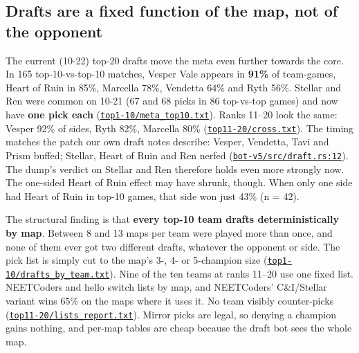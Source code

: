\documentclass[11pt,a4paper]{article}
\newcommand{\scratch}{file:///private/tmp/claude-501/-Users-tristanbasri-Desktop-Code-cambridge-battlecode-s2/b3f4cb6b-e46a-405f-957c-42c44c05c8dc/scratchpad/ladder-data}
\newcommand{\repo}{file:///Users/tristanbasri/Desktop/Code/cambridge-battlecode-s2}
\newcommand{\src}[2]{{\small(\href{#1}{\textcolor{cTop}{\texttt{#2}}})}}
\begin{document}
\subsection{Drafts are a fixed function of the map, not of the opponent}

The current (10-22) top-20 drafts move the meta even further towards the core. In 165 top-10-vs-top-10 matches, Vesper Vale appears in \textbf{91\%} of team-games, Heart of Ruin in 85\%, Marcella 78\%, Vendetta 64\% and Ryth 56\%. Stellar and Ren were common on 10-21 (67 and 68 picks in 86 top-vs-top games) and now have \textbf{one pick each} \src{\scratch/top1-10/meta_top10.txt}{top1-10/meta\_top10.txt}. Ranks 11--20 look the same: Vesper 92\% of sides, Ryth 82\%, Marcella 80\% \src{\scratch/top11-20/cross.txt}{top11-20/cross.txt}. The timing matches the patch our own draft notes describe: Vesper, Vendetta, Tavi and Prism buffed; Stellar, Heart of Ruin and Ren nerfed \src{\repo/bots/bot-v5/src/draft.rs}{bot-v5/src/draft.rs:12}. The dump's verdict on Stellar and Ren therefore holds even more strongly now. The one-sided Heart of Ruin effect may have shrunk, though. When only one side had Heart of Ruin in top-10 games, that side won just 43\% (n = 42).

The structural finding is that \textbf{every top-10 team drafts deterministically by map}. Between 8 and 13 maps per team were played more than once, and none of them ever got two different drafts, whatever the opponent or side. The pick list is simply cut to the map's 3-, 4- or 5-champion size \src{\scratch/top1-10/drafts_by_team.txt}{top1-10/drafts\_by\_team.txt}. Nine of the ten teams at ranks 11--20 use one fixed list. NEETCoders and hello switch lists by map, and NEETCoders' C\&I/Stellar variant wins 65\% on the maps where it uses it. No team visibly counter-picks \src{\scratch/top11-20/lists_report.txt}{top11-20/lists\_report.txt}. Mirror picks are legal, so denying a champion gains nothing, and per-map tables are cheap because the draft bot sees the whole map.
\end{document}
